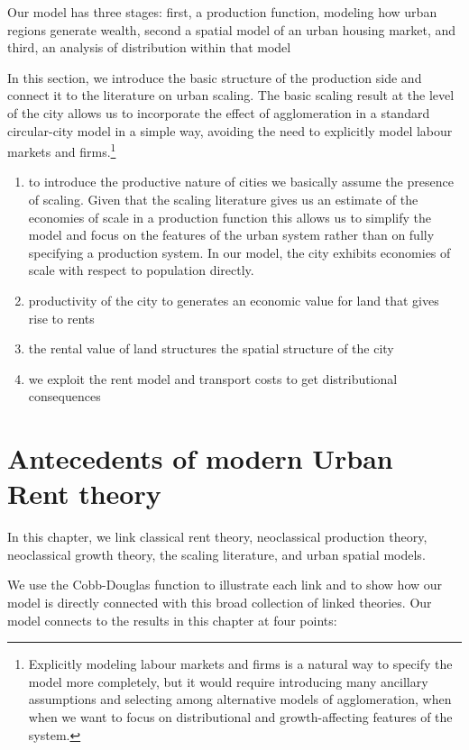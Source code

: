 Our model has three stages: first, a production function, modeling how urban regions generate wealth,  second a spatial model of an urban housing market, and third, an analysis of distribution within that model 

In this section, we introduce the basic structure of the production side and connect it to the literature on urban scaling. The basic scaling result at the level of the city allows us to incorporate the effect of agglomeration in a standard  circular-city model in a simple way, avoiding the need to explicitly model labour markets and firms.\footnote{Explicitly modeling labour markets and firms is a natural way to specify the model more completely, but it would require introducing many ancillary assumptions and selecting among alternative models of agglomeration, when when we want to focus on distributional and growth-affecting features of the system.}

\begin{enumerate}
    \item to introduce  the productive nature of cities we basically assume the presence of scaling. Given  that the scaling literature gives us an estimate of the economies of scale in a production function this allows us to simplify the model and focus on the features of the urban system rather than on fully specifying a production system. In our model, the city  exhibits economies of scale with respect to population directly. 

     \item  productivity of the city to generates an economic value for land that gives rise to rents

    \item  the rental value of land structures the spatial structure of the city

    \item we exploit the rent model and transport costs to get  distributional consequences
\end{enumerate}

\color{red}
\chapter{Antecedents of modern Urban Rent theory}
In this chapter, we link classical rent theory, neoclassical production theory, neoclassical growth theory, the scaling literature,  and urban spatial models. 

We use the Cobb-Douglas function %
to illustrate each link and to show how our  model is directly connected with this broad collection of linked theories. Our model connects to the results in this chapter at four points:



